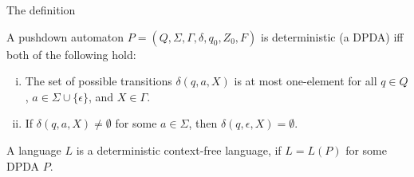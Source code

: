 \documentclass[handout]{beamer}
\begin{document}
\begin{frame}{The definition}

    \begin{definition}
        A pushdown automaton $P=(Q,\Sigma,\Gamma,\delta,q_0,Z_0,F)$ is \alert{deterministic} (a \alert{DPDA}) iff both of the following hold:
        \begin{enumerate}[(i)]
            \item The set of possible transitions $\delta(q,a,X)$ is at most one-element for all  $q\in Q$, $a\in\Sigma \cup \{\epsilon\}$, and $X\in\Gamma$.
            \item If $\delta(q,a,X)\neq\emptyset$ for some $a\in \Sigma$, then $\delta(q,\epsilon,X)=\emptyset$.
        \end{enumerate}    
    \end{definition}

    A language $L$ is a \alert{deterministic} context-free language, if $L=L(P)$ for some DPDA $P$.

\end{frame}
\end{document}

